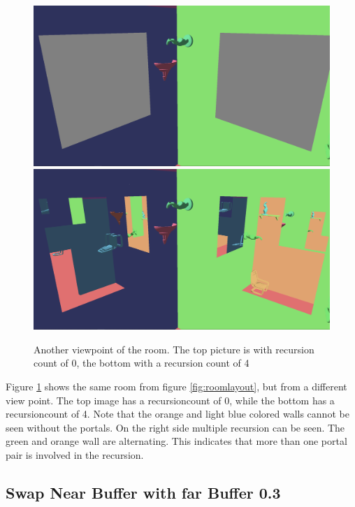 \begin{figure}[H]
	\includegraphics[width=\linewidth]{images/roomportalsr0.png}
	\includegraphics[width=\linewidth]{images/roomportals.png}
	\caption{Another viewpoint of the room.  The top picture is with recursion count of 0, the bottom with a recursion count of 4}
	\label{fig:room}
\end{figure}


Figure \ref{fig:room} shows the same room from figure \ref{fig:roomlayout}, but from a different view point. The top image has a \gls{recursioncount} of 0, while the bottom has a \gls{recursioncount} of 4. Note that the orange and light blue colored walls cannot be seen without the portals. On the right side multiple recursion can be seen. The green and orange wall are alternating. This indicates that more than one portal pair is involved in the recursion.




\subsection{Swap Near Buffer with far Buffer 0.3}


